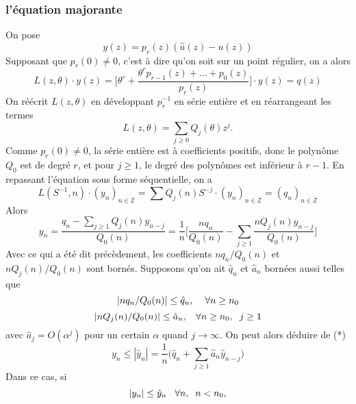 \documentclass[a4paper,10.5pt]{article}
\begin{document}
	\subsubsection{l'équation majorante}
	On pose
	\[y(z)=p_r(z)(\overset{\sim}{u}(z)-u(z))\]
	Supposant que $p_r(0) \neq 0$, c'est à dire qu'on soit sur un point régulier, on a alors 
	\[L(z,\theta)\cdot y(z)=\Big[\theta^{r}+\frac{\theta^{r}p_{r-1}(z)+...+p_0(z)}{p_r(z)}\Big]\cdot y(z)=q(z)\]
	On réécrit $L(z,\theta)$ en développant $p_r^{-1}$ en série entière et en réarrangeant les termes
	\[L(z,\theta)=\sum_{j\geq 0} Q_{j}(\theta)z^j.\]
	Comme $p_r(0)\neq 0$, la série entière est à coefficients positifs, donc le polynôme $Q_0$ est de degré $r$, et pour $j \geq 1$, le degré des polynômes est inférieur à $r-1$.
	En repassant l'équation sous forme séquentielle, on a 
	\[L(S^{-1},n)\cdot (y_n)_{n \in \mathbb{Z}}=\sum Q_j(n)S^{-j} \cdot  (y_n)_{n \in \mathbb{Z}} =(q_n)_{n \in \mathbb{Z}} \]
	Alors
	\[y_n=\frac{q_n-\sum_{j\geq1}Q_j(n)y_{n-j}}{Q_0(n)}= \frac{1}{n}\Big[\frac{nq_n}{Q_0(n)}-\sum_{j\geq1}\frac{nQ_j(n)y_{n-j}}{Q_0(n)}\Big]\tag{*}\]
	Avec ce qui a été dit précèdement, les coefficients $nq_n/Q_0(n)$ et $nQ_j(n)/Q_0(n)$ sont bornés.
	Supposons qu'on ait $\hat{q}_n$ et $\hat{a}_n$ bornées aussi telles que
	\begin{equation}
	|nq_n/Q_0(n)|\leq \hat{q}_n,  \hspace{4mm}\forall n\geq n_0
	\label{maj1}
	\end{equation}
	\begin{equation}
	|nQ_j(n)/Q_0(n)|\leq \hat{a}_n,\hspace{3mm}  \forall n\geq n_0, \hspace{2mm} j\geq 1
	\label{maj2}
	\end{equation}
	avec $\hat{a}_j=O(\alpha^j)$ pour un certain $\alpha$ quand $j \rightarrow \infty$. On peut alors déduire de (*)
	\begin{equation}
	y_n\leq|\hat{y}_n|=\frac{1}{n}\Big(\hat{q}_n+\sum_{j\geq1}\hat{a}_{n}\hat{y}_{n-j}\Big)
	\label{majrec}
	\end{equation}
	Dans ce cas, si 
	\begin{equation}
	|y_n|\leq \hat{y}_n \hspace{3mm} \forall n, \hspace{2mm} n<n_0,
	\label{maj3}
	\end{equation}
	
\end{document}
